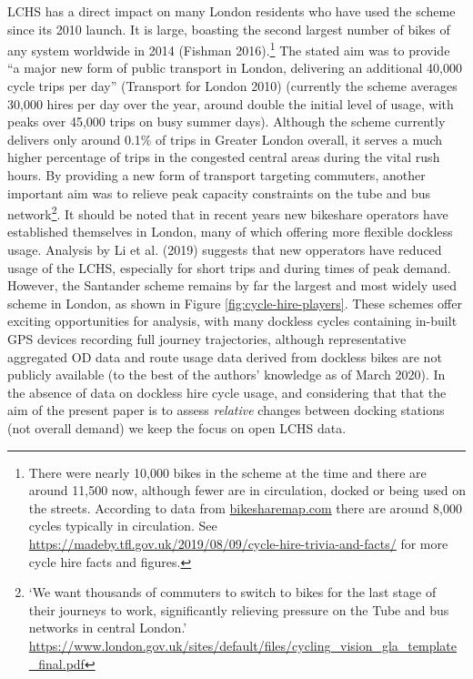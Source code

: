 \documentclass[
]{article}
\begin{document}
LCHS has a direct impact on many London residents who have used the scheme since its 2010 launch.
It is large, boasting the second largest number of bikes of any system worldwide in 2014 (Fishman 2016).\footnote{
  There were nearly 10,000 bikes in the scheme at the time and there are around 11,500 now, although fewer are in circulation, docked or being used on the streets.
  According to data from \href{https://bikesharemap.com/london/\#/12.384657071672539/-0.1195/51.5021/}{bikesharemap.com} there are around 8,000 cycles typically in circulation.
  See \url{https://madeby.tfl.gov.uk/2019/08/09/cycle-hire-trivia-and-facts/} for more cycle hire facts and figures.}
The stated aim was to provide ``a major new form of public transport in London, delivering an additional 40,000 cycle trips per day'' (Transport for London 2010) (currently the scheme averages 30,000 hires per day over the year, around double the initial level of usage, with peaks over 45,000 trips on busy summer days).
Although the scheme currently delivers only around 0.1\% of trips in Greater London overall, it serves a much higher percentage of trips in the congested central areas during the vital rush hours.
By providing a new form of transport targeting commuters, another important aim was to relieve peak capacity constraints on the tube and bus network\footnote{
  `We want thousands of commuters to switch to bikes for the last stage of their journeys to work, significantly relieving pressure on the Tube and bus networks in central London.' \url{https://www.london.gov.uk/sites/default/files/cycling_vision_gla_template_final.pdf}}. It should be noted that in recent years new bikeshare operators have established themselves in London, many of which offering more flexible dockless usage.
Analysis by Li et al. (2019) suggests that new opperators have reduced usage of the LCHS, especially for short trips and during times of peak demand.
However, the Santander scheme remains by far the largest and most widely used scheme in London, as shown in Figure \ref{fig:cycle-hire-players}.
These schemes offer exciting opportunities for analysis, with many dockless cycles containing in-built GPS devices recording full journey trajectories, although representative aggregated OD data and route usage data derived from dockless bikes are not publicly available (to the best of the authors' knowledge as of March 2020).
In the absence of data on dockless hire cycle usage, and considering that that the aim of the present paper is to assess \emph{relative} changes between docking stations (not overall demand) we keep the focus on open LCHS data.
\end{document}

